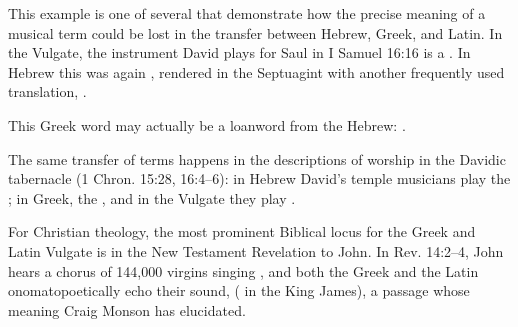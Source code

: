 This example is one of several that demonstrate how the precise meaning of a
musical term could be lost in the transfer between Hebrew, Greek, and Latin.
In the Vulgate, the instrument David plays for Saul in I Samuel 16:16 is a
.
In Hebrew this was again , rendered in the Septuagint with another
frequently used translation, .%
\begin{Footnote}
    This Greek word may actually be a loanword from the Hebrew:
    \autocite{Brown:HebrewOTLexicon}.
\end{Footnote}
The same transfer of terms happens in the descriptions of worship in the Davidic
tabernacle (1 Chron. 15:28, 16:4--6): in Hebrew David's temple musicians play
the ; in Greek, the , and in the Vulgate they
play .

For Christian theology, the most prominent Biblical locus for the Greek
 and Latin Vulgate  is in the New Testament
Revelation to John.
In Rev. 14:2--4, John hears a chorus of 144,000 virgins singing , and both the Greek and the Latin onomatopoetically
echo their sound, 
( in the King James), a passage whose
meaning Craig Monson has elucidated.%
    \autocite[88--95]{Monson:DivasConvent}

